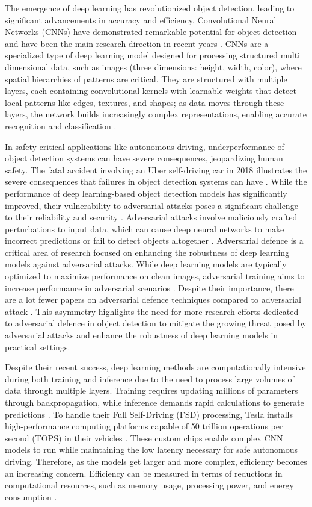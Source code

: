 \documentclass[journal,onecolumn,12pt]{IEEEtran}
\begin{document}
The emergence of deep learning has revolutionized object detection, leading to significant advancements in accuracy and efficiency. Convolutional Neural Networks (CNNs) have demonstrated remarkable potential for object detection and have been the main research direction in recent years \cite{zou2023object}. CNNs are a specialized type of deep learning model designed for processing structured multi dimensional data, such as images (three dimensions: height, width, color), where spatial hierarchies of patterns are critical. They are structured with multiple layers, each containing convolutional kernels with learnable weights that detect local patterns like edges, textures, and shapes; as data moves through these layers, the network builds increasingly complex representations, enabling accurate recognition and classification \cite{electronics10202470}.

In safety-critical applications like autonomous driving, underperformance of object detection systems can have severe consequences, jeopardizing human safety. The fatal accident involving an Uber self-driving car in 2018 illustrates the severe consequences that failures in object detection systems can have \cite{Kohli_2019}. While the performance of deep learning-based object detection models has significantly improved, their vulnerability to adversarial attacks poses a significant challenge to their reliability and security \cite{zhang2019adversarially}. Adversarial attacks involve maliciously crafted perturbations to input data, which can cause deep neural networks to make incorrect predictions or fail to detect objects altogether \cite{li2019rosa}. Adversarial defence is a critical area of research focused on enhancing the robustness of deep learning models against adversarial attacks. While deep learning models are typically optimized to maximize performance on clean images, adversarial training aims to increase performance in adversarial scenarios \cite{costa2023deep}. Despite their importance, there are a lot fewer papers on adversarial defence techniques compared to adversarial attack \cite{bai2021recent}. This asymmetry highlights the need for more research efforts dedicated to adversarial defence in object detection to mitigate the growing threat posed by adversarial attacks and enhance the robustness of deep learning models in practical settings.

Despite their recent success, deep learning methods are computationally intensive during both training and inference due to the need to process large volumes of data through multiple layers. Training requires updating millions of parameters through backpropagation, while inference demands rapid calculations to generate predictions \cite{objDetect}. To handle their Full Self-Driving (FSD) processing, Tesla installs high-performance computing platforms capable of 50 trillion operations per second (TOPS) in their vehicles \cite{10588595}. These custom chips enable complex CNN models to run while maintaining the low latency necessary for safe autonomous driving. Therefore, as the models get larger and more complex, efficiency becomes an increasing concern. Efficiency can be measured in terms of reductions in computational resources, such as memory usage, processing power, and energy consumption \cite{electronics11060945}. 
\end{document}

